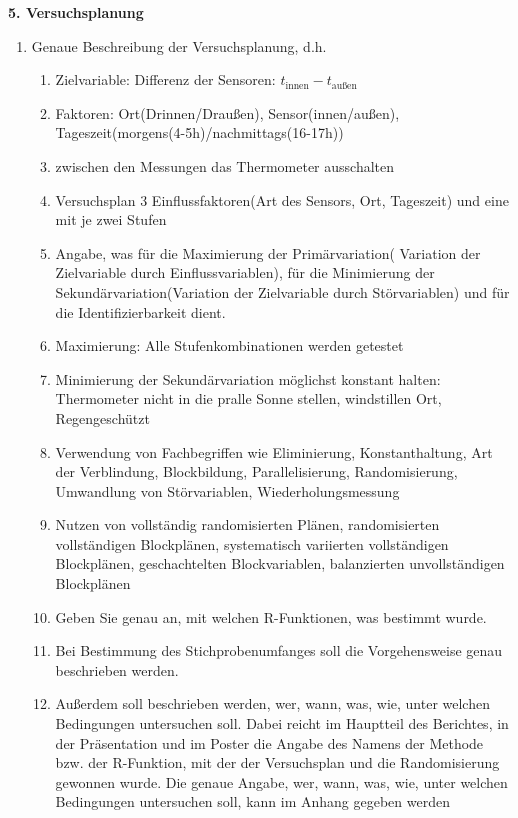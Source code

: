 \documentclass[ ngerman, fontsize= 12pt, paper=a4, headings=big, titlepage=true]{article}
\begin{document}
\textbf{5. Versuchsplanung}
\begin{enumerate}[-]
\item  Genaue Beschreibung der Versuchsplanung, d.h.
\begin{enumerate}[*]
	\item Zielvariable: Differenz der Sensoren: $t_{\text{innen}}-t_{\text{außen}}$
	\item Faktoren: Ort(Drinnen/Draußen), Sensor(innen/außen), Tageszeit(morgens(4-5h)/nachmittags(16-17h))
	\item zwischen den Messungen das Thermometer ausschalten
	\item Versuchsplan 3 Einflussfaktoren(Art des Sensors, Ort, Tageszeit) und eine mit je zwei Stufen
	\item Angabe, was für die Maximierung der Primärvariation( Variation der Zielvariable durch Einflussvariablen), für die Minimierung der
	Sekundärvariation(Variation der Zielvariable durch Störvariablen) und für die Identifizierbarkeit dient.
	\item Maximierung: Alle Stufenkombinationen werden getestet
	\item Minimierung der Sekundärvariation möglichst konstant halten: Thermometer nicht in die pralle Sonne stellen, windstillen Ort, Regengeschützt
	
	\item Verwendung von Fachbegriffen wie Eliminierung, Konstanthaltung, Art der Verblindung, Blockbildung, Parallelisierung, Randomisierung, Umwandlung von Störvariablen, Wiederholungsmessung
	\item Nutzen von vollständig randomisierten Plänen, randomisierten vollständigen Blockplänen, systematisch variierten vollständigen Blockplänen, geschachtelten Blockvariablen, balanzierten unvollständigen Blockplänen
	
	\item Geben Sie genau an, mit welchen R-Funktionen, was bestimmt wurde.
	\item Bei Bestimmung des Stichprobenumfanges soll die Vorgehensweise genau beschrieben
	werden. 
	\item Außerdem soll beschrieben werden, wer, wann, was, wie, unter welchen Bedingungen
	untersuchen soll. Dabei reicht im Hauptteil des Berichtes, in der Präsentation und
	im Poster die Angabe des Namens der Methode bzw. der R-Funktion, mit der
	der Versuchsplan und die Randomisierung gewonnen wurde. Die genaue Angabe,
	wer, wann, was, wie, unter welchen Bedingungen untersuchen soll, kann im Anhang
	gegeben werden
	
	

\end{enumerate}
\end{enumerate}
\end{document}
